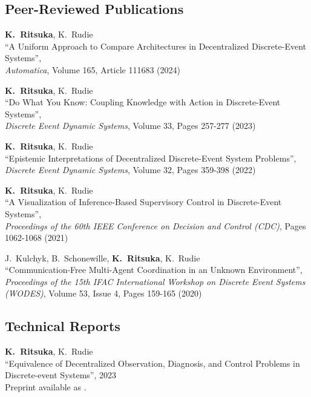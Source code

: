 \documentclass[margin]{res}
\begin{document}
\begin{resume}
\subsection{Peer-Reviewed Publications}

{\bf K.~Ritsuka}, K.~Rudie\\
``A Uniform Approach to Compare Architectures in Decentralized Discrete-Event Systems'',\\
\emph{Automatica},
Volume 165, Article 111683 (2024)\\

{\bf K.~Ritsuka}, K.~Rudie\\
``Do What You Know: Coupling Knowledge with Action in Discrete-Event Systems'',\\
\emph{Discrete Event Dynamic Systems},
Volume 33, Pages 257-277 (2023)\\

{\bf K.~Ritsuka}, K.~Rudie\\
``Epistemic Interpretations of Decentralized Discrete-Event System Problems'',\\
\emph{Discrete Event Dynamic Systems},
Volume 32, Pages 359-398 (2022)\\

{\bf K.~Ritsuka}, K.~Rudie\\
``A Visualization of Inference-Based Supervisory Control in Discrete-Event Systems'',\\
\emph{Proceedings of the 60th IEEE Conference on Decision and Control (CDC)},
Pages 1062-1068 (2021)\\

J.~Kulchyk, B.~Schonewille, {\bf K.~Ritsuka}, K.~Rudie\\
``Communication-Free Multi-Agent Coordination in an Unknown Environment'',\\
\emph{Proceedings of the 15th IFAC International Workshop on Discrete Event Systems (WODES)},
Volume 53, Issue 4, Pages 159-165 (2020)\\

\subsection{Technical Reports}

{\bf K.~Ritsuka}, K.~Rudie\\
``Equivalence of Decentralized Observation, Diagnosis, and Control Problems in Discrete-event Systems'',
2023\\
Preprint available as .


\end{resume}
\end{document}
